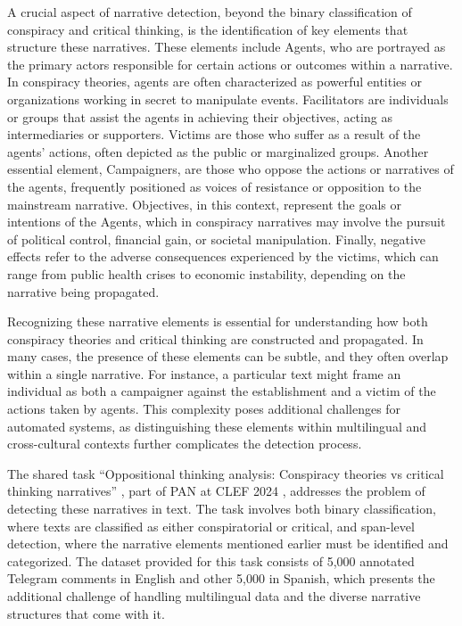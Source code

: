 \documentclass{Configuration_Files/PoliMi3i_thesis}
\begin{document}
A crucial aspect of narrative detection, beyond the binary classification of conspiracy and critical thinking, is the identification of key elements that structure these narratives. These elements include Agents, who are portrayed as the primary actors responsible for certain actions or outcomes within a narrative. In conspiracy theories, agents are often characterized as powerful entities or organizations working in secret to manipulate events. Facilitators are individuals or groups that assist the agents in achieving their objectives, acting as intermediaries or supporters. Victims are those who suffer as a result of the agents’ actions, often depicted as the public or marginalized groups. Another essential element, Campaigners, are those who oppose the actions or narratives of the agents, frequently positioned as voices of resistance or opposition to the mainstream narrative. Objectives, in this context, represent the goals or intentions of the Agents, which in conspiracy narratives may involve the pursuit of political control, financial gain, or societal manipulation. Finally, negative effects refer to the adverse consequences experienced by the victims, which can range from public health crises to economic instability, depending on the narrative being propagated.

Recognizing these narrative elements is essential for understanding how both conspiracy theories and critical thinking are constructed and propagated. In many cases, the presence of these elements can be subtle, and they often overlap within a single narrative. For instance, a particular text might frame an individual as both a campaigner against the establishment and a victim of the actions taken by agents. This complexity poses additional challenges for automated systems, as distinguishing these elements within multilingual and cross-cultural contexts further complicates the detection process.

The shared task ``Oppositional thinking analysis: Conspiracy theories vs critical thinking narratives'' \cite{korencic2024oppositional}, part of PAN at CLEF 2024 \cite{bevendorff:2024}, addresses the problem of detecting these narratives in text. The task involves both binary classification, where texts are classified as either conspiratorial or critical, and span-level detection, where the narrative elements mentioned earlier must be identified and categorized. The dataset provided for this task consists of 5,000 annotated Telegram comments in English and other 5,000 in Spanish, which presents the additional challenge of handling multilingual data and the diverse narrative structures that come with it.
\end{document}
